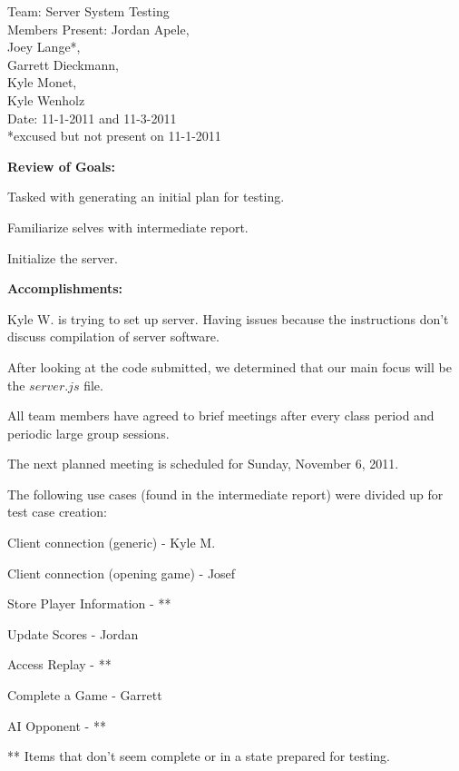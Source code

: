 \documentclass[12pt]{article}
\newenvironment{itemize*}%
  {\begin{itemize}%
  	\setlength{\parsep}{0pt}
    \setlength{\itemsep}{0pt}%
    \setlength{\parskip}{0pt}}%
  {\end{itemize}}
\begin{document}
\thispagestyle{empty}
\begin{flushleft}
\singlespacing
Team: Server System Testing\\
Members Present: Jordan Apele,\\
Joey Lange*,\\
Garrett Dieckmann,\\
Kyle Monet,\\
Kyle Wenholz\\
Date: 11-1-2011 and 11-3-2011\\
*excused but not present on 11-1-2011
\end{flushleft}
\pagestyle{fancy}
\textbf{Review of Goals:}\\
\begin{itemize*}
\item Tasked with generating an initial plan for testing.
\item Familiarize selves with intermediate report.
\item Initialize the server.
\end{itemize*}

\textbf{Accomplishments:}\\
\begin{itemize*}
\item Kyle W. is trying to set up server. Having issues because the instructions don't discuss compilation of server software.  
\item After looking at the code submitted, we determined that our main focus will be the $server.js$ file.  
\item All team members have agreed to brief meetings after every class period and periodic large group sessions.
\item The next planned meeting is scheduled for Sunday, November 6, 2011.
\begin{itemize*}
\item The following use cases (found in the intermediate report) were divided up for test case creation:
\item Client connection (generic) - Kyle M.
\item Client connection (opening game) - Josef
\item Store Player Information - **
\item Update Scores - Jordan
\item Access Replay - **
\item Complete a Game - Garrett
\item AI Opponent - **
\end{itemize*}
\end{itemize*}
** Items that don't seem complete or in a state prepared for testing.\\
\end{document}
